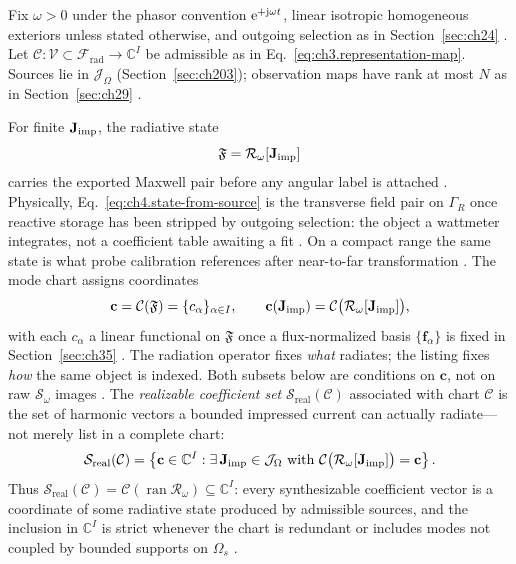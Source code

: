 Fix $\omega>0$ under the phasor convention $\mathrm{e}^{+\mathrm{j}\omega t}$, linear isotropic homogeneous exteriors unless stated otherwise, and outgoing selection as in Section~\ref{sec:ch24} \cite{stratton1941}. Let $\mathcal{C}:\mathcal{V}\subset\mathcal{F}_{\mathrm{rad}}\to\mathbb{C}^{I}$ be admissible as in Eq.~\eqref{eq:ch3.representation-map}. Sources lie in $\mathcal{J}_\Omega$ (Section~\ref{sec:ch203}); observation maps have rank at most $N$ as in Section~\ref{sec:ch29} \cite{hansen1988}.

For finite \(\mathbf{J}_{\mathrm{imp}}\), the radiative state
\begin{equation}
\label{eq:ch4.state-from-source}
\mathfrak{F}
=
\mathcal{R}_\omega[\mathbf{J}_{\mathrm{imp}}]
\end{equation}
carries the exported Maxwell pair before any angular label is attached
\cite{stratton1941}. Physically, Eq.~\eqref{eq:ch4.state-from-source} is the transverse field pair on $\Gamma_R$ once reactive storage has been stripped by outgoing selection: the object a wattmeter integrates, not a coefficient table awaiting a fit \cite{hansen1988}. On a compact range the same state is what probe calibration references after near-to-far transformation \cite{stratton1941}. The mode chart assigns coordinates
\begin{equation}
\label{eq:ch4.coefficient-vector}
\mathbf{c}
=
\mathcal{C}(\mathfrak{F})
=
\{c_\alpha\}_{\alpha\in I},
\qquad
\mathbf{c}(\mathbf{J}_{\mathrm{imp}})
=
\mathcal{C}\big(\mathcal{R}_\omega[\mathbf{J}_{\mathrm{imp}}]\big),
\end{equation}
with each \(c_\alpha\) a linear functional on \(\mathfrak{F}\) once a flux-normalized basis
\(\{\mathbf{f}_\alpha\}\) is fixed in Section~\ref{sec:ch35} \cite{hansen1988}.
The radiation operator fixes \emph{what} radiates; the listing fixes \emph{how} the same object is indexed.
Both subsets below are conditions on \(\mathbf{c}\), not on raw \(\mathcal{S}_\omega\) images \cite{devaney2004}.
\label{def:ch4.realizable-synthesis-set}
The \emph{realizable coefficient set} \(\mathcal{S}_{\mathrm{real}}(\mathcal{C})\) associated with chart \(\mathcal{C}\) is the set of harmonic vectors a bounded impressed current can actually radiate---not merely list in a complete chart:
\begin{equation}
\label{eq:ch4.realizable-synthesis-set}
\mathcal{S}_{\mathrm{real}}(\mathcal{C})
=
\left\{
\mathbf{c}\in\mathbb{C}^{I}:
\exists\,\mathbf{J}_{\mathrm{imp}}\in\mathcal{J}_\Omega\ \text{with}\
\mathcal{C}\big(\mathcal{R}_\omega[\mathbf{J}_{\mathrm{imp}}]\big)=\mathbf{c}
\right\}.
\end{equation}
Thus $\mathcal{S}_{\mathrm{real}}(\mathcal{C})=\mathcal{C}(\operatorname{ran}\mathcal{R}_\omega)\subseteq\mathbb{C}^{I}$: every synthesizable coefficient vector is a coordinate of some radiative state produced by admissible sources, and the inclusion in $\mathbb{C}^{I}$ is strict whenever the chart is redundant or includes modes not coupled by bounded supports on $\Omega_s$ \cite{chu1948,stratton1941}.

